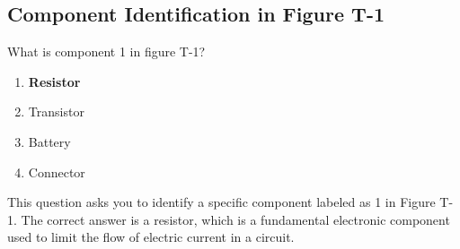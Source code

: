 \subsection{Component Identification in Figure T-1}
\label{T6C02}

\begin{tcolorbox}[colback=gray!10!white,colframe=black!75!black,title=T6C02]
What is component 1 in figure T-1?
\begin{enumerate}[noitemsep]
    \item \textbf{Resistor}
    \item Transistor
    \item Battery
    \item Connector
\end{enumerate}
\end{tcolorbox}

This question asks you to identify a specific component labeled as 1 in Figure T-1. The correct answer is a resistor, which is a fundamental electronic component used to limit the flow of electric current in a circuit.